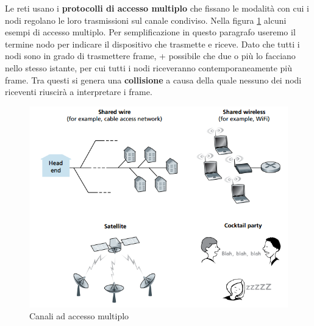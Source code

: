 \documentclass[11pt,a4paper]{book}
\begin{document}
Le reti usano i \textbf{protocolli di accesso multiplo} che fissano le modalità con cui i nodi regolano le loro trasmissioni sul canale condiviso. Nella figura \ref{fig: 076} alcuni esempi di accesso multiplo. Per semplificazione in questo paragrafo useremo il termine nodo per indicare il dispositivo che trasmette e riceve. Dato che tutti i nodi sono in grado di trasmettere frame, + possibile che due o più lo facciano nello stesso istante, per cui tutti i nodi riceveranno contemporaneamente più frame. Tra questi si genera una \textbf{collisione} a causa della quale nessuno dei nodi riceventi riuscirà a interpretare i frame.

\begin{figure}
	\begin{center}
		\includegraphics[scale=0.6]{img/076.png}
		\caption{Canali ad accesso multiplo}
		\label{fig: 076}
	\end{center}
\end{figure}
\end{document}
